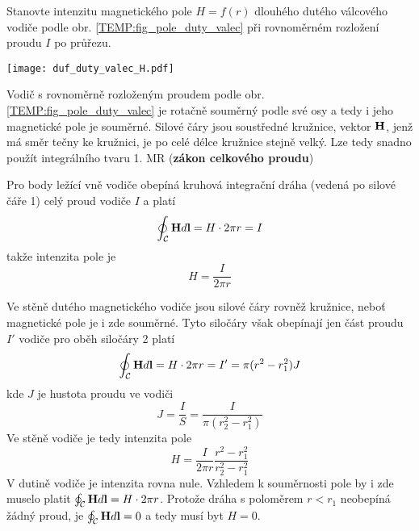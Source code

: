 \begin{example}
  Stanovte intenzitu magnetického pole $H=f(r)$ dlouhého dutého válcového vodiče podle obr.
  \ref{TEMP:fig_pole_duty_valec} při rovnoměrném rozložení proudu $I$ po průřezu. 
  
   {\centering
    \captionsetup{type=figure}
    \texttt{[image: duf\_duty\_valec\_H.pdf]}
    \label{TEMP:fig_pole_duty_valec}
  \par}
  
  Vodič s rovnoměrně rozloženým proudem podle obr. \ref{TEMP:fig_pole_duty_valec} je rotačně
  souměrný podle své osy a tedy i jeho magnetické pole je souměrné. Silové čáry jsou soustředné
  kružnice, vektor $\mathbf{H}$, jenž má směr tečny ke kružnici, je po celé délce kružnice stejně
  velký. Lze tedy snadno použít integrálního tvaru 1. MR (\textbf{zákon celkového proudu})
  
  Pro body ležící vně vodiče obepíná kruhová integrační dráha (vedená po silové čáře 1) celý
  proud vodiče $I$ a platí
  \begin{equation}\label{TEMP:eq_1MR_duty_valec}
    \oint_{\mathcal{C}}\mathbf{H}d\mathbf{l} = H\cdot 2\pi r = I
  \end{equation}
  takže intenzita pole je
  \begin{equation}\label{TEMP:eq_H_duty_valec}
    H = \frac{I}{2\pi r}
  \end{equation}
  
  Ve stěně dutého magnetického vodiče jsou silové čáry rovněž kružnice, neboť magnetické pole
  je i zde souměrné. Tyto siločáry však obepínají jen část proudu $I'$ vodiče pro oběh siločáry
  2 platí
  \begin{equation}\label{TEMP:eq_1MR_uvnitr_valce}
    \oint_{\mathcal{C}}\mathbf{H}d\mathbf{l} = H\cdot 2\pi r = I' = \pi(r^2-r_1^2)J
  \end{equation}
  kde $J$ je hustota proudu ve vodiči
  \begin{equation}\label{TEMP:eq_J_duty_valec}
    J = \frac{I}{S}= \frac{I}{\pi(r_2^2-r_1^2)}
  \end{equation}
  Ve stěně vodiče je tedy intenzita pole
  \begin{equation}\label{TEMP:eq_H_uvnitr_valce}
    H = \frac{I}{2\pi r}\frac{r^2-r_1^2}{r_2^2-r_1^2}
  \end{equation}
  V dutině vodiče je intenzita rovna nule. Vzhledem k souměrnosti pole by i zde muselo platit
  $\oint_{\mathcal{C}}\mathbf{H}d\mathbf{l} = H\cdot 2\pi r$. Protože dráha s poloměrem $r<r_1$ neobepíná
  žádný proud, je $\oint_{\mathcal{C}}\mathbf{H}d\mathbf{l} = 0$ a tedy musí byt $H = 0$.
\end{example}    
